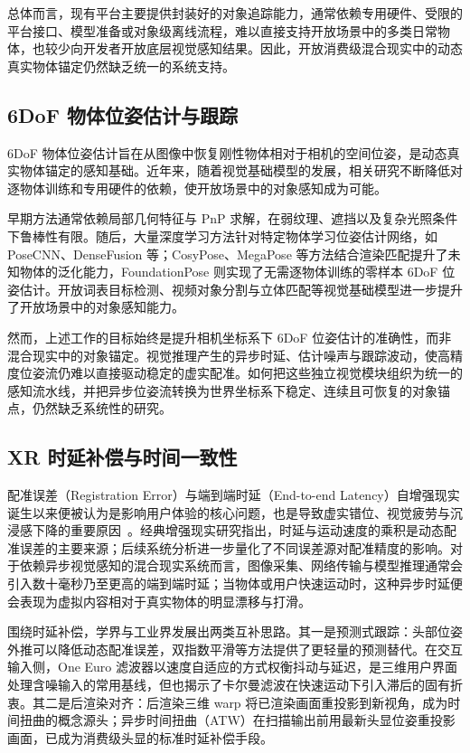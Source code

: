 \documentclass[review]{vgtc}
\begin{document}
总体而言，现有平台主要提供封装好的对象追踪能力，通常依赖专用硬件、受限的平台接口、模型准备或对象级离线流程，难以直接支持开放场景中的多类日常物体，也较少向开发者开放底层视觉感知结果。因此，开放消费级混合现实中的动态真实物体锚定仍然缺乏统一的系统支持。

\subsection{6DoF 物体位姿估计与跟踪}


6DoF 物体位姿估计旨在从图像中恢复刚性物体相对于相机的空间位姿，是动态真实物体锚定的感知基础。近年来，随着视觉基础模型的发展，相关研究不断降低对逐物体训练和专用硬件的依赖，使开放场景中的对象感知成为可能。

早期方法通常依赖局部几何特征与 PnP 求解，在弱纹理、遮挡以及复杂光照条件下鲁棒性有限。随后，大量深度学习方法针对特定物体学习位姿估计网络，如 PoseCNN、DenseFusion 等；CosyPose、MegaPose 等方法结合渲染匹配提升了未知物体的泛化能力，FoundationPose 则实现了无需逐物体训练的零样本 6DoF 位姿估计。开放词表目标检测、视频对象分割与立体匹配等视觉基础模型进一步提升了开放场景中的对象感知能力。

然而，上述工作的目标始终是提升相机坐标系下 6DoF 位姿估计的准确性，而非混合现实中的对象锚定。视觉推理产生的异步时延、估计噪声与跟踪波动，使高精度位姿流仍难以直接驱动稳定的虚实配准。如何把这些独立视觉模块组织为统一的感知流水线，并把异步位姿流转换为世界坐标系下稳定、连续且可恢复的对象锚点，仍然缺乏系统性的研究。

\subsection{XR 时延补偿与时间一致性}


配准误差（Registration Error）与端到端时延（End-to-end Latency）自增强现实诞生以来便被认为是影响用户体验的核心问题，也是导致虚实错位、视觉疲劳与沉浸感下降的重要原因~\cite{azuma1994improving,diluca2010latency}。经典增强现实研究指出，时延与运动速度的乘积是动态配准误差的主要来源；后续系统分析进一步量化了不同误差源对配准精度的影响。对于依赖异步视觉感知的混合现实系统而言，图像采集、网络传输与模型推理通常会引入数十毫秒乃至更高的端到端时延；当物体或用户快速运动时，这种异步时延便会表现为虚拟内容相对于真实物体的明显漂移与打滑。

围绕时延补偿，学界与工业界发展出两类互补思路。其一是预测式跟踪：头部位姿外推可以降低动态配准误差，双指数平滑等方法提供了更轻量的预测替代。在交互输入侧，One Euro 滤波器以速度自适应的方式权衡抖动与延迟，是三维用户界面处理含噪输入的常用基线，但也揭示了卡尔曼滤波在快速运动下引入滞后的固有折衷。其二是后渲染对齐：后渲染三维 warp 将已渲染画面重投影到新视角，成为时间扭曲的概念源头；异步时间扭曲（ATW）在扫描输出前用最新头显位姿重投影画面，已成为消费级头显的标准时延补偿手段。
\end{document}
